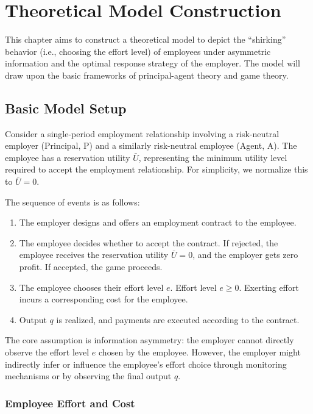 \chapter{Theoretical Model Construction}
\label{chap:model}

This chapter aims to construct a theoretical model to depict the \enquote{shirking} behavior (i.e., choosing the effort level) of employees under asymmetric information and the optimal response strategy of the employer. The model will draw upon the basic frameworks of principal-agent theory and game theory.

\section{Basic Model Setup}
\label{sec:model_setup}

Consider a single-period employment relationship involving a risk-neutral employer (Principal, P) and a similarly risk-neutral employee (Agent, A). The employee has a reservation utility $\bar{U}$, representing the minimum utility level required to accept the employment relationship. For simplicity, we normalize this to $\bar{U} = 0$.

The sequence of events is as follows:
\begin{enumerate}
    \item The employer designs and offers an employment contract to the employee.
    \item The employee decides whether to accept the contract. If rejected, the employee receives the reservation utility $\bar{U}=0$, and the employer gets zero profit. If accepted, the game proceeds.
    \item The employee chooses their effort level $e$. Effort level $e \ge 0$. Exerting effort incurs a corresponding cost for the employee.
    \item Output $q$ is realized, and payments are executed according to the contract.
\end{enumerate}

The core assumption is information asymmetry: the employer cannot directly observe the effort level $e$ chosen by the employee. However, the employer might indirectly infer or influence the employee's effort choice through monitoring mechanisms or by observing the final output $q$.

\subsection{Employee Effort and Cost}

